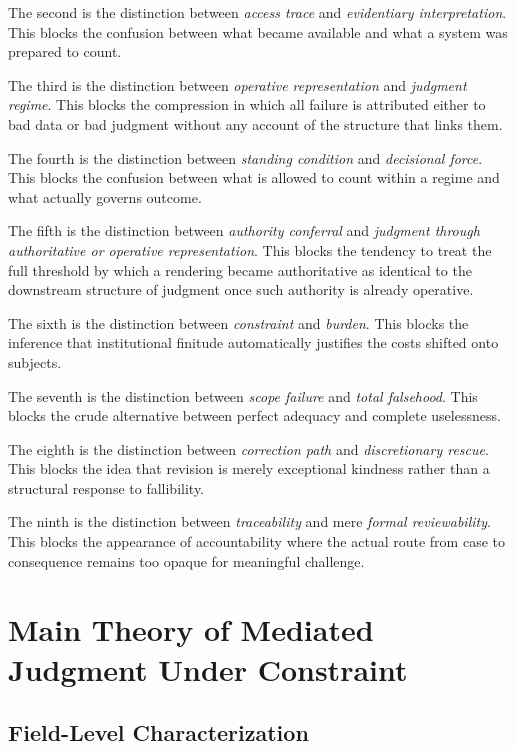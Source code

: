 \documentclass[11pt]{article}
\renewcommand{\emph}[1]{\textit{#1}}
\begin{document}
The second is the distinction between \emph{access trace} and \emph{evidentiary interpretation}. This blocks the confusion between what became available and what a system was prepared to count.

The third is the distinction between \emph{operative representation} and \emph{judgment regime}. This blocks the compression in which all failure is attributed either to bad data or bad judgment without any account of the structure that links them.

The fourth is the distinction between \emph{standing condition} and \emph{decisional force}. This blocks the confusion between what is allowed to count within a regime and what actually governs outcome.

The fifth is the distinction between \emph{authority conferral} and \emph{judgment through authoritative or operative representation}. This blocks the tendency to treat the full threshold by which a rendering became authoritative as identical to the downstream structure of judgment once such authority is already operative.

The sixth is the distinction between \emph{constraint} and \emph{burden}. This blocks the inference that institutional finitude automatically justifies the costs shifted onto subjects.

The seventh is the distinction between \emph{scope failure} and \emph{total falsehood}. This blocks the crude alternative between perfect adequacy and complete uselessness.

The eighth is the distinction between \emph{correction path} and \emph{discretionary rescue}. This blocks the idea that revision is merely exceptional kindness rather than a structural response to fallibility.

The ninth is the distinction between \emph{traceability} and mere \emph{formal reviewability}. This blocks the appearance of accountability where the actual route from case to consequence remains too opaque for meaningful challenge.

\section{Main Theory of Mediated Judgment Under Constraint}

\subsection{Field-Level Characterization}
\end{document}
